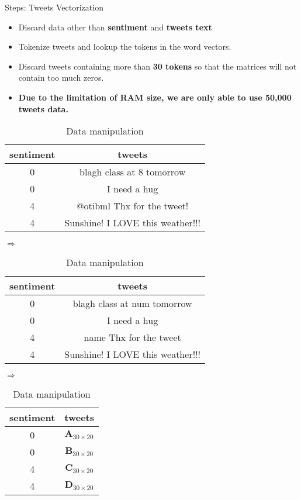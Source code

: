 \documentclass{beamer}
\begin{document}
\begin{frame}{Steps: Tweets Vectorization}
	\begin{itemize}
		\item Discard data other than \textbf{sentiment} and \textbf{tweets text}
		\item Tokenize tweets and lookup the tokens in the word vectors.
		\item Discard tweets containing more than \textbf{30 tokens} so that the matrices will not contain too much zeros.
		\item \textbf{Due to the limitation of RAM size, we are only able to use 50,000 tweets data.} 

	\end{itemize}
	\begin{table}[htpb]
		\scriptsize
		\centering
		\caption{Data manipulation}
		\label{tab:dataMan}
		\begin{tabular}{c c}
			sentiment & tweets \\
			\hline
			 0 & blagh class at 8 tomorrow  \\
			 0 & I need a hug  \\
			 4 & @otibml Thx for the tweet!  \\
			 4 & Sunshine! I LOVE this weather!!!  \\
		\end{tabular}
		$\Rightarrow$
		\begin{tabular}{c c}
			sentiment & tweets \\
			\hline
			 0 & blagh class at num tomorrow \\
			 0 & I need a hug \\
			 4 & name Thx for the tweet\\
			 4 & Sunshine! I LOVE this weather!!! \\
		\end{tabular}
		$\Rightarrow$
		\begin{tabular}{c c}
			sentiment & tweets \\
			\hline
			0 & $ \mathbf{A}_{ 30 \times 20 }  $ \\
			0 & $ \mathbf{B}_{ 30 \times 20 }  $ \\
			4 & $ \mathbf{C}_{ 30 \times 20 }  $ \\
			4 & $ \mathbf{D}_{ 30 \times 20 }  $ \\
		\end{tabular}
	\end{table}
	
\end{frame}
\end{document}
